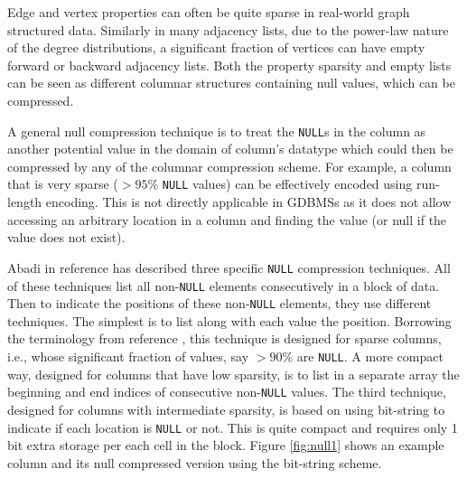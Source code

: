 Edge and vertex properties can often be quite sparse in real-world graph structured data. Similarly in many adjacency lists, due to the power-law nature of the degree distributions, a significant fraction of vertices can have empty forward or backward adjacency lists. Both the property sparsity and empty lists can be seen as different columnar structures containing null values, which can be compressed.


A general null compression technique is to treat the \texttt{NULL}s in the column as another potential value in the domain of column's datatype which could then be compressed by any of the columnar compression scheme. For example, a column that is very sparse ($>95\%$ \texttt{NULL} values) can be effectively encoded using run-length encoding. This is not directly applicable in GDBMSs as it does not allow accessing an arbitrary location in a column and finding the value (or null if the value does not exist).

Abadi in reference \cite{abadi-sparse-col} has described three specific \texttt{NULL} compression techniques. All of these techniques list all non-\texttt{NULL} elements consecutively in a block of data. Then to indicate the positions of these non-\texttt{NULL} elements, they use different techniques. The simplest is to list along with each value the position. Borrowing the terminology from reference \cite{abadi-sparse-col}, this technique is designed for sparse columns, i.e., whose significant fraction of values, say $> 90\%$ are \texttt{NULL}. A more compact way, designed for columns that have low sparsity, is to list in a separate array the beginning and end indices of consecutive non-\texttt{NULL} values. The third technique, designed for columns with intermediate sparsity, is based on using bit-string to indicate if each location is \texttt{NULL} or not.  This is quite compact and requires only 1 bit extra storage per each cell in the block. Figure \ref{fig:null1} shows an example column and its null compressed version using the bit-string scheme. 

